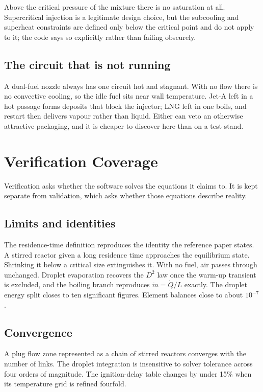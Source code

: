 \documentclass[11pt]{article}
\begin{document}
Above the critical pressure of the mixture there is no saturation at all. Supercritical
injection is a legitimate design choice, but the subcooling and superheat constraints are
defined only below the critical point and do not apply to it; the code says so explicitly
rather than failing obscurely.

\subsection{The circuit that is not running}

A dual-fuel nozzle always has one circuit hot and stagnant. With no flow there is no
convective cooling, so the idle fuel sits near wall temperature. Jet-A left in a hot
passage forms deposits that block the injector; LNG left in one boils, and restart then
delivers vapour rather than liquid. Either can veto an otherwise attractive packaging, and
it is cheaper to discover here than on a test stand.

\section{Verification Coverage}

Verification asks whether the software solves the equations it claims to. It is kept
separate from validation, which asks whether those equations describe reality.

\subsection{Limits and identities}

The residence-time definition reproduces the identity the reference paper states.
A stirred reactor given a long residence time approaches the equilibrium state. Shrinking
it below a critical size extinguishes it. With no fuel, air passes through unchanged.
Droplet evaporation recovers the $D^2$ law once the warm-up transient is excluded, and the
boiling branch reproduces $\dot m=\dot Q/L$ exactly. The droplet energy split closes to ten
significant figures. Element balances close to about $10^{-7}$.

\subsection{Convergence}

A plug flow zone represented as a chain of stirred reactors converges with the number of
links. The droplet integration is insensitive to solver tolerance across four orders of
magnitude. The ignition-delay table changes by under 15\% when its temperature grid is
refined fourfold.
\end{document}
